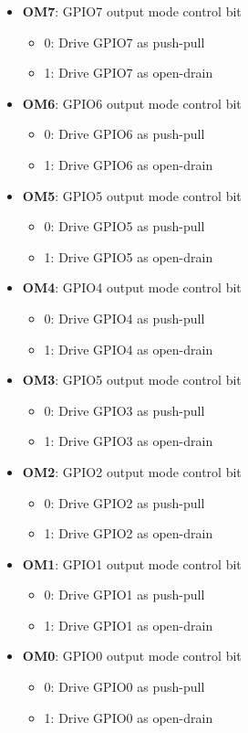 \documentclass{article}
\begin{document}
	\begin{itemize}
		\item \textbf{OM7}: GPIO7 output mode control bit
		\begin{itemize}
			\item 0: Drive GPIO7 as push-pull
			\item 1: Drive GPIO7 as open-drain
		\end{itemize}
		\item \textbf{OM6}: GPIO6 output mode control bit
		\begin{itemize}
			\item 0: Drive GPIO6 as push-pull
			\item 1: Drive GPIO6 as open-drain
		\end{itemize}
		\item \textbf{OM5}: GPIO5 output mode control bit
		\begin{itemize}
			\item 0: Drive GPIO5 as push-pull
			\item 1: Drive GPIO5 as open-drain
		\end{itemize}
		\item \textbf{OM4}: GPIO4 output mode control bit
		\begin{itemize}
			\item 0: Drive GPIO4 as push-pull
			\item 1: Drive GPIO4 as open-drain
		\end{itemize}
		\item \textbf{OM3}: GPIO5 output mode control bit
		\begin{itemize}
			\item 0: Drive GPIO3 as push-pull
			\item 1: Drive GPIO3 as open-drain
		\end{itemize}
		\item \textbf{OM2}: GPIO2 output mode control bit
		\begin{itemize}
			\item 0: Drive GPIO2 as push-pull
			\item 1: Drive GPIO2 as open-drain
		\end{itemize}
		\item \textbf{OM1}: GPIO1 output mode control bit
		\begin{itemize}
			\item 0: Drive GPIO1 as push-pull
			\item 1: Drive GPIO1 as open-drain
		\end{itemize}
		\item \textbf{OM0}: GPIO0 output mode control bit
		\begin{itemize}
			\item 0: Drive GPIO0 as push-pull
			\item 1: Drive GPIO0 as open-drain
		\end{itemize}
	\end{itemize}
\end{document}
